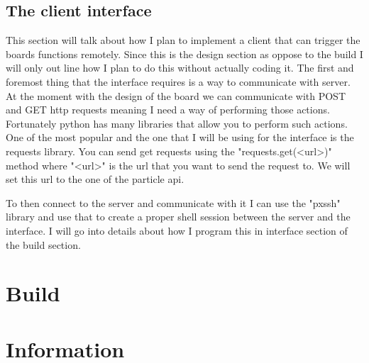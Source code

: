 \documentclass{article}
\begin{document}
\subsection{The client interface}
This section will talk about how I plan to implement a client that can trigger the boards functions
remotely. Since this is the design section as oppose to the build I will only out line how I plan to
do this without actually coding it. The first and foremost thing that the interface requires is a
way to communicate with server. At the moment with the design of the board we can communicate with
POST and GET http requests meaning I need a way of performing those actions. Fortunately python has
many libraries that allow you to perform such actions. One of the most popular and the one that I
will be using for the interface is the requests library\cite{pythonRequests}. You can send get
requests using the "requests.get(<url>)" method where "<url>" is the url that you want to send the
request to. We will set this url to the one of the particle api.

To then connect to the server and communicate with it I can use the "pxssh" library and use that to
create a proper shell session between the server and the interface. I will go into details about
how I program this in interface section of the build section.


\pagebreak

\section{Build}

\section{Information}
\end{document}

